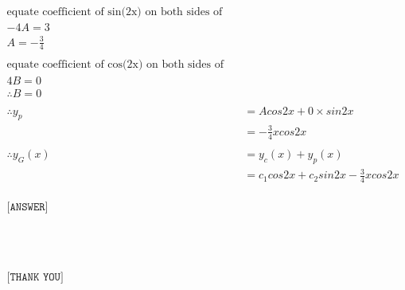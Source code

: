 \documentclass{article}
\begin{document}
\begin{homeworkProblem}
    \[
    \begin{split}
        \text{equate coefficient of sin(2x) on both sides of equation (i):}
        \\
        -4A = 3
        \\
        A = - \frac{3}{4}
        \\ \\
        \text{equate coefficient of cos(2x) on both sides of equation (i):}
        \\
        4B = 0
        \\
        \therefore B = 0
        \\
        \\
        \therefore y_p &= A cos 2 x + 0 \times sin 2x 
        \\
        & = - \frac{3}{4} x cos 2 x
        \\ \\
        \therefore y_G(x) &= y_c (x) + y_p (x)
        \\
        &= c_1 cos 2x + c_2 sin 2x - \frac{3}{4} x cos 2 x
        \\ \\ \\ \\ 
        \texttt{[ANSWER]}
        \\ \\ \\ \\ \\ \\ \\ \\ \\ \\ \\ \\ 
        \texttt{[THANK YOU]}
    \end{split}
    \]
\end{homeworkProblem}


\end{document}
